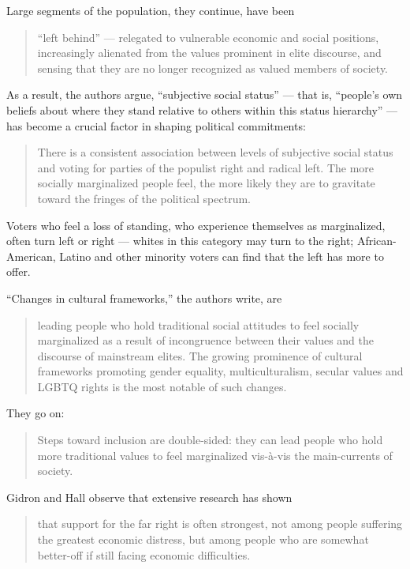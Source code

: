 Large segments of the population, they continue, have been

\begin{quote}
``left behind'' --- relegated to vulnerable economic and social
positions, increasingly alienated from the values prominent in elite
discourse, and sensing that they are no longer recognized as valued
members of society.
\end{quote}

As a result, the authors argue, ``subjective social status'' --- that
is, ``people's own beliefs about where they stand relative to others
within this status hierarchy'' --- has become a crucial factor in
shaping political commitments:

\begin{quote}
There is a consistent association between levels of subjective social
status and voting for parties of the populist right and radical left.
The more socially marginalized people feel, the more likely they are to
gravitate toward the fringes of the political spectrum.
\end{quote}

Voters who feel a loss of standing, who experience themselves as
marginalized, often turn left or right --- whites in this category may
turn to the right; African-American, Latino and other minority voters
can find that the left has more to offer.

``Changes in cultural frameworks,'' the authors write, are

\begin{quote}
leading people who hold traditional social attitudes to feel socially
marginalized as a result of incongruence between their values and the
discourse of mainstream elites. The growing prominence of cultural
frameworks promoting gender equality, multiculturalism, secular values
and LGBTQ rights is the most notable of such changes.
\end{quote}

They go on:

\begin{quote}
Steps toward inclusion are double-sided: they can lead people who hold
more traditional values to feel marginalized vis-à-vis the main-currents
of society.
\end{quote}

Gidron and Hall observe that extensive research has shown

\begin{quote}
that support for the far right is often strongest, not among people
suffering the greatest economic distress, but among people who are
somewhat better-off if still facing economic difficulties.
\end{quote}

